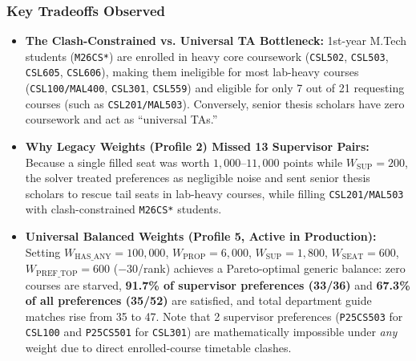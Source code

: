 \documentclass[12pt,a4paper]{article}
\begin{document}
\subsubsection{Key Tradeoffs Observed}
\begin{itemize}[leftmargin=*]
    \item \textbf{The Clash-Constrained vs. Universal TA Bottleneck:} 1st-year M.Tech students (\texttt{M26CS*}) are enrolled in heavy core coursework (\texttt{CSL502}, \texttt{CSL503}, \texttt{CSL605}, \texttt{CSL606}), making them ineligible for most lab-heavy courses (\texttt{CSL100/MAL400}, \texttt{CSL301}, \texttt{CSL559}) and eligible for only 7 out of 21 requesting courses (such as \texttt{CSL201/MAL503}). Conversely, senior thesis scholars have zero coursework and act as ``universal TAs.''
    \item \textbf{Why Legacy Weights (Profile 2) Missed 13 Supervisor Pairs:} Because a single filled seat was worth $1{,}000$--$11{,}000$ points while $W_{\text{SUP}} = 200$, the solver treated preferences as negligible noise and sent senior thesis scholars to rescue tail seats in lab-heavy courses, while filling \texttt{CSL201/MAL503} with clash-constrained \texttt{M26CS*} students.
    \item \textbf{Universal Balanced Weights (Profile 5, Active in Production):} Setting $W_{\text{HAS\_ANY}}=100{,}000$, $W_{\text{PROP}}=6{,}000$, $W_{\text{SUP}}=1{,}800$, $W_{\text{SEAT}}=600$, $W_{\text{PREF\_TOP}}=600$ ($-30$/rank) achieves a Pareto-optimal generic balance: zero courses are starved, \textbf{91.7\% of supervisor preferences (33/36)} and \textbf{67.3\% of all preferences (35/52)} are satisfied, and total department guide matches rise from 35 to 47. Note that 2 supervisor preferences (\texttt{P25CS503} for \texttt{CSL100} and \texttt{P25CS501} for \texttt{CSL301}) are mathematically impossible under \textit{any} weight due to direct enrolled-course timetable clashes.
\end{itemize}
\end{document}
